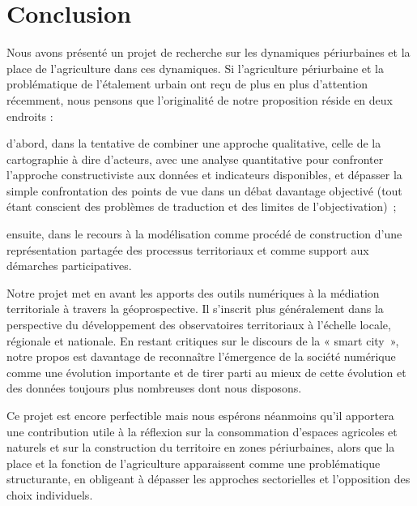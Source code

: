\section
{Conclusion}

Nous avons présenté un projet de recherche sur les dynamiques périurbaines et
la place de l’agriculture dans ces dynamiques. Si l’agriculture périurbaine et
la problématique de l’étalement urbain ont reçu de plus en plus d’attention
récemment, nous pensons que l’originalité de notre proposition réside en deux
endroits :

\startitemize

\item d’abord, dans la tentative de combiner une approche qualitative, celle de la
cartographie à dire d’acteurs, avec une analyse quantitative pour confronter
l’approche constructiviste aux données et indicateurs disponibles, et dépasser
la simple confrontation des points de vue dans un débat davantage objectivé
(tout étant conscient des problèmes de traduction et des limites de
l’objectivation) ;

\item ensuite, dans le recours à la modélisation comme procédé de construction d’une
représentation partagée des processus territoriaux et comme support aux
démarches participatives.

\stopitemize

Notre projet met en avant les apports des outils numériques à la médiation
territoriale à travers la géoprospective. Il s'inscrit plus généralement dans
la perspective du développement des observatoires territoriaux à l’échelle
locale, régionale et nationale. En restant critiques sur le discours de la «
smart city », notre propos est davantage de reconnaître l’émergence de la
société numérique comme une évolution importante et de tirer parti au mieux de
cette évolution et des données toujours plus nombreuses dont nous disposons.

Ce projet est encore perfectible mais nous espérons néanmoins qu’il apportera
une contribution utile à la réflexion sur la consommation d’espaces agricoles
et naturels et sur la construction du territoire en zones périurbaines, alors
que la place et la fonction de l’agriculture apparaissent comme une
problématique structurante, en obligeant à dépasser les approches sectorielles
et l’opposition des choix individuels.